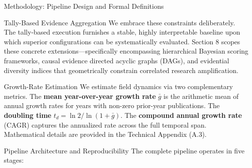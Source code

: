 \documentclass[
  ignorenonframetext,
]{beamer}
\begin{document}
\begin{frame}[fragile]{Methodology: Pipeline Design and Formal
Definitions}
\begin{block}{Tally-Based Evidence Aggregation}
We embrace these constraints deliberately. The tally-based execution
furnishes a stable, highly interpretable baseline upon which superior
configurations can be systematically evaluated. Section 8 scopes these
concrete extensions---specifically encompassing hierarchical Bayesian
scoring frameworks, causal evidence directed acyclic graphs (DAGs), and
evidential diversity indices that geometrically constrain correlated
research amplification.
\end{block}

\begin{block}{Growth-Rate Estimation}
\protect{}\label{growth-rate-estimation}
We estimate field dynamics via two complementary metrics. The
\textbf{mean year-over-year growth rate} \(\bar{g}\) is the arithmetic
mean of annual growth rates for years with non-zero prior-year
publications. The \textbf{doubling time}
\(t_d = \ln 2 / \ln(1 + \bar{g})\). The \textbf{compound annual growth
rate} (CAGR) captures the annualized rate across the full temporal span.
Mathematical details are provided in the Technical Appendix (A.3).
\end{block}

\begin{block}{Pipeline Architecture and Reproducibility}
\protect{}\label{pipeline-architecture-and-reproducibility}
The complete pipeline operates in five stages:


\end{block}
\end{frame}
\end{document}
